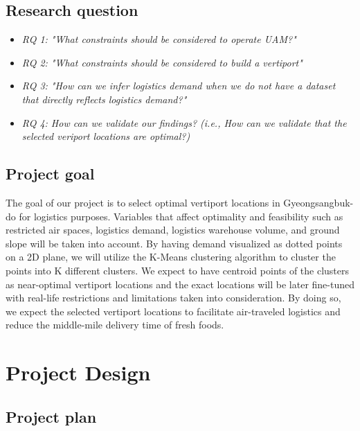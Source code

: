 \documentclass[11pt]{article}
\begin{document}
    \subsection{Research question}

    \begin{itemize}
        \item \emph{RQ 1: "What constraints should be considered to operate UAM?"
        }
         
        \item \emph{RQ 2:  "What constraints should be considered to build a vertiport"}

        \item \emph{RQ 3: "How can we infer logistics demand when we do not have a dataset that directly reflects logistics demand?"
        }

        \item \emph{RQ 4: How can we validate our findings? (i.e., How can we validate that the selected veriport locations are optimal?)
        }
        

    \end{itemize}


    \subsection{Project goal}
    The goal of our project is to select optimal vertiport locations in Gyeongsangbuk-do for logistics purposes. Variables that affect optimality and feasibility such as restricted air spaces, logistics demand, logistics warehouse volume, and ground slope will be taken into account. By having demand visualized as dotted points on a 2D plane, we will utilize the K-Means clustering algorithm to cluster the points into K different clusters. We expect to have centroid points of the clusters as near-optimal vertiport locations and the exact locations will be later fine-tuned with real-life restrictions and limitations taken into consideration. By doing so, we expect the selected vertiport locations to facilitate air-traveled logistics and reduce the middle-mile delivery time of fresh foods. 
   
    \section{Project Design}
    \subsection{Project plan}                       
       
\end{document}
